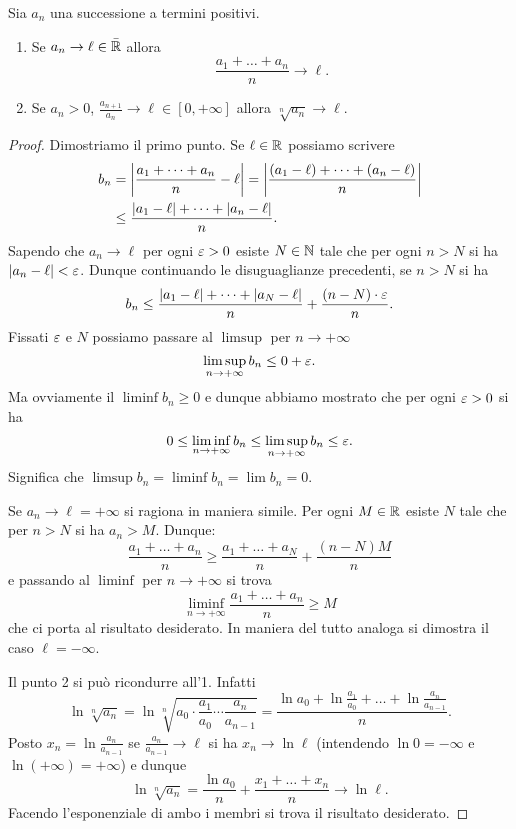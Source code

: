 \begin{theorem}
\label{th:criterio_cesaro}%
\mymark{*}%
%
%
%
Sia $a_n$ una successione a termini positivi.
\begin{enumerate}
\item
  Se
  $   a_n \to \ell \in \bar {\mathbb R}$
  allora
  \[
  \frac{a_1 + \dots + a_n}{n} \to \ell.
  \]

\item
  Se $a_n>0$,
  $\displaystyle\frac{a_{n+1}}{a_n} \to \ell \in [0,+\infty]$
  allora
  $\displaystyle \sqrt[n]{a_n}\to \ell$.
\end{enumerate}
\end{theorem}
%
\begin{proof}
Dimostriamo il primo punto.
Se $\ell\in \mathbb R$ possiamo scrivere
\begin{align*}
b_n &= {\left|\frac{a_1 + \dots + a_n}{n} - \ell\right|}
  = {\left|\frac{(a_1-\ell) + \dots + (a_n-\ell)}{n}\right|}\\
  &\le \frac{{\left|a_1-\ell\right|} + \dots + {\left|a_n-\ell\right|}}{n}.
\end{align*}
Sapendo che $a_n\to \ell$ per ogni $\varepsilon>0$
esiste $N\in \mathbb N$ tale che per ogni $n>N$ si ha
${\left|a_n-\ell\right|}<\varepsilon$.
Dunque continuando le disuguaglianze precedenti,
se $n>N$
si ha
\[
b_n \le \frac{{\left|a_1-\ell\right|} + \dots + {\left|a_N-\ell\right|}}{n}
    + \frac{(n-N)\cdot\varepsilon}{n}.
\]
Fissati $\varepsilon$ e $N$ possiamo
passare al $\limsup$ per $n\to +\infty$
\[
\limsup_{n\to+\infty} b_n
\le 0 + \varepsilon.
\]
Ma ovviamente il $\liminf b_n \ge 0$ e
dunque abbiamo mostrato che per ogni $\varepsilon >0$ si ha
\[
0 \le \liminf_{n\to+\infty} b_n \le \limsup_{n\to+\infty} b_n \le \varepsilon.
\]
Significa che $\limsup b_n = \liminf b_n = \lim b_n = 0$.

Se $a_n\to \ell=+\infty$ si ragiona in maniera simile.
Per ogni $M\in \mathbb R$ esiste $N$ tale che per $n>N$ si ha $a_n>M$.
Dunque:
\[
  \frac{a_1+\dots + a_n}{n}
  \ge \frac{a_1 + \dots + a_N}{n} + \frac{(n-N)M}{n}
\]
e passando al $\liminf $ per $n\to +\infty$ si trova
\[
 \liminf_{n\to+\infty} \frac{a_1 + \dots + a_n}{n}
 \ge M
\]
che ci porta al risultato desiderato.
In maniera del tutto analoga si dimostra il caso $\ell=-\infty$.

Il punto 2 si può ricondurre all'1.
Infatti
\[
  \ln \sqrt[n]{a_n}
  = \ln \sqrt[n]{a_0\cdot \frac{a_1}{a_0} \cdots \frac{a_n}{a_{n-1}}}
  = \frac{\ln a_0 + \ln \frac{a_1}{a_0} + \dots + \ln \frac{a_n}{a_{n-1}}}{n}.
\]
Posto $x_n = \ln \frac{a_n}{a_{n-1}}$
se $\frac{a_n}{a_{n-1}}\to \ell$
si ha $x_n\to \ln \ell$ (intendendo $\ln 0 = -\infty$ e $\ln (+\infty)=+\infty$) e dunque
\[
  \ln \sqrt[n]{a_n} = \frac{\ln a_0}{n} + \frac{x_1 + \dots + x_n}{n}
  \to \ln \ell.
\]
Facendo l'esponenziale di ambo i membri si trova il risultato desiderato.
\end{proof}


